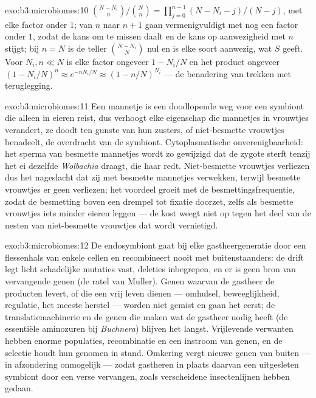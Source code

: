 \begin{solution}{exo:b3:microbiomes:10}
$\binom{N-N_{i}}{n}/\binom{N}{n} = \prod_{j=0}^{n-1}(N - N_{i} - j)/(N -
j)$, met elke factor onder $1$; van $n$ naar $n + 1$ gaan
vermenigvuldigt met nog een factor onder $1$, zodat de kans om te
missen daalt en de kans op aanwezigheid met $n$ stijgt; bij $n = N$ is
de teller $\binom{N -
N_{i}}{N}$ nul en is elke soort aanwezig, wat $S$ geeft. Voor $N_{i},
n \ll N$ is elke factor ongeveer $1 - N_{i}/N$ en het product ongeveer
$(1 -
N_{i}/N)^{n} \approx e^{-nN_{i}/N} \approx (1 - n/N)^{N_{i}}$ --- de
benadering van trekken met teruglegging.
\end{solution}

\begin{solution}{exo:b3:microbiomes:11}
Een mannetje is een doodlopende weg voor een symbiont die alleen in
eieren reist, dus verhoogt elke eigenschap die mannetjes in vrouwtjes
verandert, ze doodt ten gunste van hun zusters, of niet-besmette
vrouwtjes benadeelt, de overdracht van de symbiont. Cytoplasmatische
onverenigbaarheid: het sperma van besmette mannetjes wordt zo gewijzigd
dat de zygote sterft tenzij het ei dezelfde \emph{Wolbachia} draagt, die
haar redt. Niet-besmette vrouwtjes verliezen dus het nageslacht dat zij
met besmette mannetjes verwekken, terwijl besmette vrouwtjes er geen
verliezen; het voordeel groeit met de besmettingsfrequentie, zodat de
besmetting boven een drempel tot fixatie doorzet, zelfs als besmette
vrouwtjes iets minder eieren leggen --- de kost weegt niet op tegen het
deel van de nesten van niet-besmette vrouwtjes dat wordt vernietigd.
\end{solution}

\begin{solution}{exo:b3:microbiomes:12}
De endosymbiont gaat bij elke gastheergeneratie door een flessenhals
van enkele cellen en recombineert nooit met buitenstaanders: de drift
legt licht schadelijke mutaties vast, deleties inbegrepen, en er is
geen bron van vervangende genen (de ratel van Muller). Genen waarvan de
gastheer de producten levert, of die een vrij leven dienen ---
omhulsel, beweeglijkheid, regulatie, het meeste herstel --- worden niet
gemist en gaan het eerst; de translatiemachinerie en de genen die maken
wat de gastheer nodig heeft (de essentiële aminozuren bij
\emph{Buchnera}) blijven het langst. Vrijlevende verwanten hebben
enorme populaties, recombinatie en een instroom van genen, en de
selectie houdt hun genomen in stand. Omkering vergt nieuwe genen van
buiten --- in afzondering onmogelijk --- zodat gastheren in plaats
daarvan een uitgesleten symbiont door een verse vervangen, zoals
verscheidene insectenlijnen hebben gedaan.
\end{solution}

